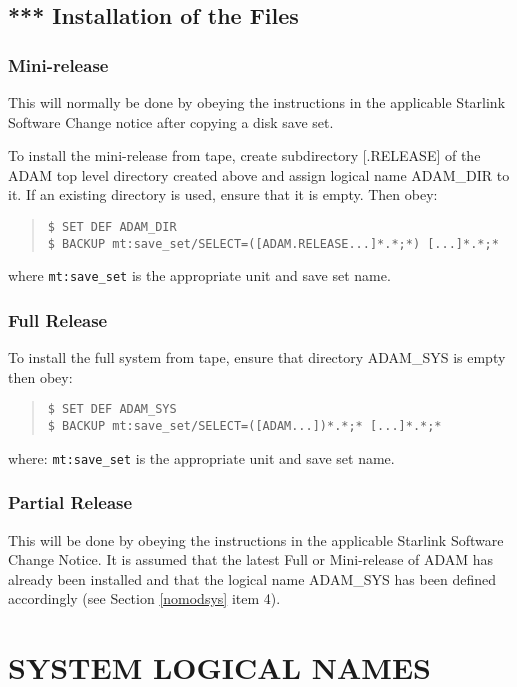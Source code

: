 \subsection{*** Installation of the Files}
\subsubsection{Mini-release}
This will normally be done by obeying the instructions in the applicable
Starlink Software Change notice after copying a disk save set.

To install the mini-release from tape, create subdirectory [.RELEASE]
of the ADAM top level directory created above and assign logical name ADAM\_DIR 
to it. If an existing directory is used, ensure that it is empty. Then obey:
\small \begin{quote}
\begin{verbatim}
$ SET DEF ADAM_DIR
$ BACKUP mt:save_set/SELECT=([ADAM.RELEASE...]*.*;*) [...]*.*;*
\end{verbatim}
\end{quote} \normalsize
where \verb+mt:save_set+ is the appropriate unit and save set name. 

\subsubsection{Full Release}
To install the full system from tape, ensure that directory ADAM\_SYS is empty
then obey:
\small \begin{quote}
\begin{verbatim}
$ SET DEF ADAM_SYS
$ BACKUP mt:save_set/SELECT=([ADAM...])*.*;* [...]*.*;*
\end{verbatim}
\end{quote} \normalsize
where: \verb+mt:save_set+ is the appropriate unit and save set name. 

\subsubsection{Partial Release}
This will be done by obeying the instructions in the applicable Starlink
Software Change Notice.
It is assumed that the latest Full or Mini-release of ADAM has already been
installed and that the logical name ADAM\_SYS has been defined accordingly
(see Section \ref{nomodsys} item 4).

\section{SYSTEM LOGICAL NAMES}

